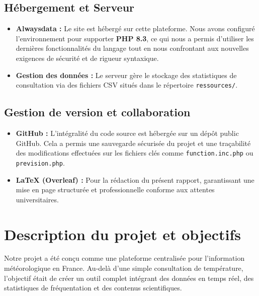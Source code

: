 \documentclass[12pt,a4paper]{article}
\begin{document}
\subsection{Hébergement et Serveur}
\begin{itemize}
    \item \textbf{Alwaysdata :} Le site est hébergé sur cette plateforme. Nous avons configuré l'environnement pour supporter \textbf{PHP 8.3}, ce qui nous a permis d'utiliser les dernières fonctionnalités du langage tout en nous confrontant aux nouvelles exigences de sécurité et de rigueur syntaxique.
    \item \textbf{Gestion des données :} Le serveur gère le stockage des statistiques de consultation via des fichiers CSV situés dans le répertoire \texttt{ressources/}.
\end{itemize}

\subsection{Gestion de version et collaboration}
\begin{itemize}
    \item \textbf{GitHub :} L'intégralité du code source est hébergée sur un dépôt public GitHub. Cela a permis une sauvegarde sécurisée du projet et une traçabilité des modifications effectuées sur les fichiers clés comme \texttt{function.inc.php} ou \texttt{prevision.php}.
    \item \textbf{LaTeX (Overleaf) :} Pour la rédaction du présent rapport, garantissant une mise en page structurée et professionnelle conforme aux attentes universitaires.
\end{itemize}

\vfill
{} \par
\newpage
\section{Description du projet et objectifs}

Notre projet a été conçu comme une plateforme centralisée pour l'information météorologique en France. Au-delà d'une simple consultation de température, l'objectif était de créer un outil complet intégrant des données en temps réel, des statistiques de fréquentation et des contenus scientifiques.
\end{document}
